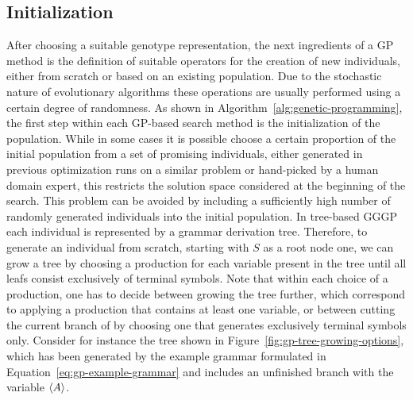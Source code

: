 \subsection{Initialization}
After choosing a suitable genotype representation, the next ingredients of a GP method is the definition of suitable operators for the creation of new individuals, either from scratch or based on an existing population.
Due to the stochastic nature of evolutionary algorithms these operations are usually performed using a certain degree of randomness.
As shown in Algorithm~\ref{alg:genetic-programming}, the first step within each GP-based search method is the initialization of the population. 
While in some cases it is possible choose a certain proportion of the initial population from a set of promising individuals, either generated in previous optimization runs on a similar problem or hand-picked by a human domain expert, this restricts the solution space considered at the beginning of the search.
This problem can be avoided by including a sufficiently high number of randomly generated individuals into the initial population. 
In tree-based GGGP each individual is represented by a grammar derivation tree.
Therefore, to generate an individual from scratch, starting with $S$ as a root node one, we can grow a tree by choosing a production for each variable present in the tree until all leafs consist exclusively of terminal symbols.
Note that within each choice of a production, one has to decide between growing the tree further, which correspond to applying a production that contains at least one variable, or between cutting the current branch of by choosing one that generates exclusively terminal symbols only.
Consider for instance the tree shown in Figure~\ref{fig:gp-tree-growing-options}, which has been generated by the example grammar formulated in Equation~\eqref{eq:gp-example-grammar} and includes an unfinished branch with the variable $\langle A \rangle$.
